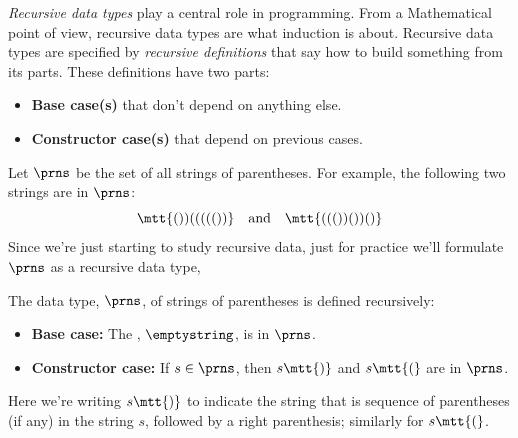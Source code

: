 
\emph{Recursive data types} play a central role in programming.  From a
Mathematical point of view, recursive data types are what induction is
about.  Recursive data types are specified by \emph{recursive definitions}
that say how to build something from its parts.  These definitions have
two parts:
\begin{itemize}
\item \textbf{Base case(s)} that don't depend on anything else.
\item \textbf{Constructor case(s)} that depend on previous cases.
\end{itemize}


Let $\prns$ be the set of all strings of parentheses.  For example,
the following two strings are in $\prns$:
\begin{equation}\label{2strings}
\mtt{())((((())}\quad \text{and}\quad \mtt{((())())()}
\end{equation}
Since we're just starting to study recursive data, just for practice we'll
formulate $\prns$ as a recursive data type,

\begin{definition}\label{prns-def}
The data type, $\prns$, of strings of parentheses is defined recursively:

\begin{itemize}

\item \textbf{Base case:} The , $\emptystring$, is in
  $\prns$.

\item \textbf{Constructor case:} If $s \in \prns$, then
$s\mtt{)}$ and $s\mtt{(}$ are in $\prns$.

\end{itemize}

\end{definition}

Here we're writing $s\mtt{)}$ to indicate the string that is sequence of
parentheses (if any) in the string $s$, followed by a right parenthesis;
similarly for $s\mtt{(}$.

